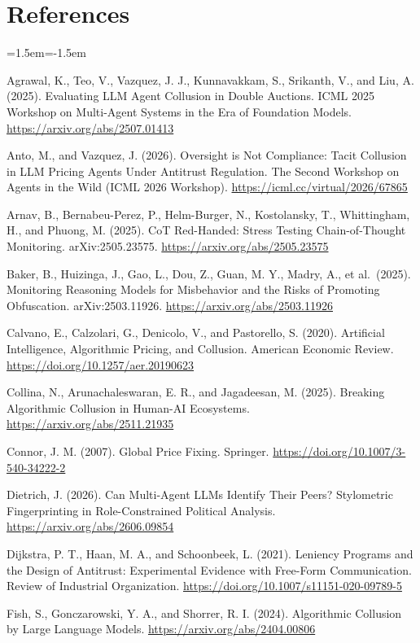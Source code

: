 \documentclass[10pt]{article}
\begin{document}
\section{References}
\begin{list}{}{\leftmargin=1.5em\itemindent=-1.5em\itemsep=2pt\parsep=0pt}\small
\item Agrawal, K., Teo, V., Vazquez, J. J., Kunnavakkam, S., Srikanth, V., and Liu, A. (2025). Evaluating LLM Agent Collusion in Double Auctions. ICML 2025 Workshop on Multi-Agent Systems in the Era of Foundation Models. \url{https://arxiv.org/abs/2507.01413}
\item Anto, M., and Vazquez, J. (2026). Oversight is Not Compliance: Tacit Collusion in LLM Pricing Agents Under Antitrust Regulation. The Second Workshop on Agents in the Wild (ICML 2026 Workshop). \url{https://icml.cc/virtual/2026/67865}
\item Arnav, B., Bernabeu-Perez, P., Helm-Burger, N., Kostolansky, T., Whittingham, H., and Phuong, M. (2025). CoT Red-Handed: Stress Testing Chain-of-Thought Monitoring. arXiv:2505.23575. \url{https://arxiv.org/abs/2505.23575}
\item Baker, B., Huizinga, J., Gao, L., Dou, Z., Guan, M. Y., Madry, A., et al.~(2025). Monitoring Reasoning Models for Misbehavior and the Risks of Promoting Obfuscation. arXiv:2503.11926. \url{https://arxiv.org/abs/2503.11926}
\item Calvano, E., Calzolari, G., Denicolo, V., and Pastorello, S. (2020). Artificial Intelligence, Algorithmic Pricing, and Collusion. American Economic Review. \url{https://doi.org/10.1257/aer.20190623}
\item Collina, N., Arunachaleswaran, E. R., and Jagadeesan, M. (2025). Breaking Algorithmic Collusion in Human-AI Ecosystems. \url{https://arxiv.org/abs/2511.21935}
\item Connor, J. M. (2007). Global Price Fixing. Springer. \url{https://doi.org/10.1007/3-540-34222-2}
\item Dietrich, J. (2026). Can Multi-Agent LLMs Identify Their Peers? Stylometric Fingerprinting in Role-Constrained Political Analysis. \url{https://arxiv.org/abs/2606.09854}
\item Dijkstra, P. T., Haan, M. A., and Schoonbeek, L. (2021). Leniency Programs and the Design of Antitrust: Experimental Evidence with Free-Form Communication. Review of Industrial Organization. \url{https://doi.org/10.1007/s11151-020-09789-5}
\item Fish, S., Gonczarowski, Y. A., and Shorrer, R. I. (2024). Algorithmic Collusion by Large Language Models. \url{https://arxiv.org/abs/2404.00806}

\end{list}
\end{document}
